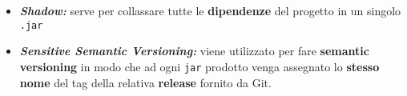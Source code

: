 \begin{itemize}
\begin{itemize}
	   		\item \textit{\textbf{Shadow:}} serve per collassare tutte le \textbf{dipendenze} del progetto in un singolo \texttt{.jar}
	   		\item \textit{\textbf{Sensitive Semantic Versioning:}} viene utilizzato per fare \textbf{semantic versioning} in modo che ad ogni \texttt{jar} prodotto venga assegnato lo \textbf{stesso nome} del tag della relativa \textbf{release} fornito da Git.   
		\end{itemize}

\end{itemize}









